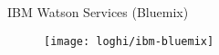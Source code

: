 %
\begin{frame}[t]{IBM Watson Services (Bluemix)}
	\begin{figure}[!h]
	\centering
	\vfill
	\texttt{[image: loghi/ibm-bluemix]}
	\vfill
	\end{figure}
\end{frame}
%
